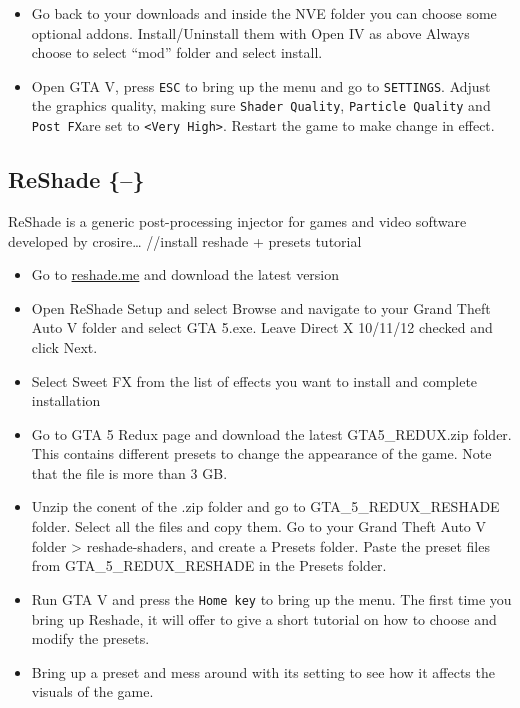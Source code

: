 \documentclass[
  openany]{book}
\begin{document}
\begin{itemize}
\item
  Go back to your downloads and inside the NVE folder you can choose some optional addons. Install/Uninstall them with Open IV as above Always choose to select ``mod'' folder and select install.
\item
  Open GTA V, press \texttt{ESC} to bring up the menu and go to \texttt{SETTINGS}. Adjust the graphics quality, making sure \texttt{Shader\ Quality}, \texttt{Particle\ Quality} and \texttt{Post\ FX}are set to \texttt{\textless{}Very\ High\textgreater{}}. Restart the game to make change in effect.
\end{itemize}

\hypertarget{reshade}{%
\subsection{ReShade \{--\}}\label{reshade}}

ReShade is a generic post-processing injector for games and video software developed by crosire\ldots{}
//install reshade + presets tutorial

\begin{itemize}
\item
  Go to \href{http://static.reshade.me/}{reshade.me} and download the latest version
\item
  Open ReShade Setup and select Browse and navigate to your Grand Theft Auto V folder and select GTA 5.exe. Leave Direct X 10/11/12 checked and click Next.
\item
  Select Sweet FX from the list of effects you want to install and complete installation
\item
  Go to GTA 5 Redux page and download the latest GTA5\_REDUX.zip folder. This contains different presets to change the appearance of the game. Note that the file is more than 3 GB.
\item
  Unzip the conent of the .zip folder and go to GTA\_5\_REDUX\_RESHADE folder. Select all the files and copy them. Go to your Grand Theft Auto V folder \textgreater{} reshade-shaders, and create a Presets folder. Paste the preset files from GTA\_5\_REDUX\_RESHADE in the Presets folder.
\item
  Run GTA V and press the \texttt{Home\ key} to bring up the menu. The first time you bring up Reshade, it will offer to give a short tutorial on how to choose and modify the presets.
\item
  Bring up a preset and mess around with its setting to see how it affects the visuals of the game.
\end{itemize}
\end{document}
